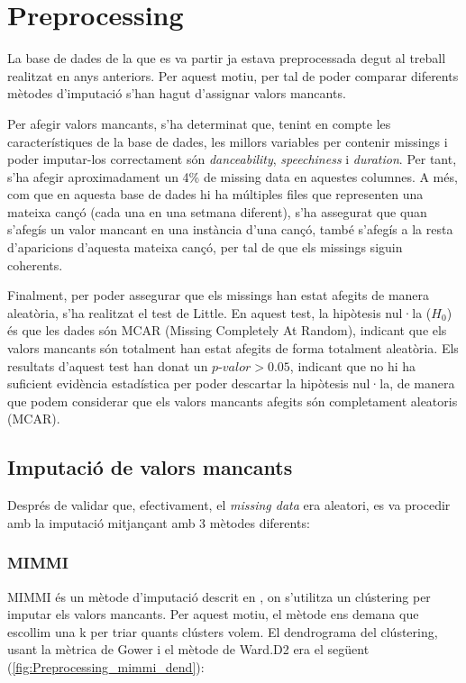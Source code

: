 \section{Preprocessing}
La base de dades de la que es va partir ja estava preprocessada degut al treball realitzat en anys anteriors. Per aquest motiu, per tal de poder comparar diferents mètodes d'imputació s'han hagut d'assignar valors mancants.

Per afegir valors mancants, s'ha determinat que, tenint en compte les característiques de la base de dades, les millors variables per contenir missings i poder imputar-los correctament són \textit{danceability}, \textit{speechiness} i \textit{duration}. Per tant, s'ha afegir aproximadament un 4\% de missing data en aquestes columnes. A més, com que en aquesta base de dades hi ha múltiples files que representen una mateixa cançó (cada una en una setmana diferent), s'ha assegurat que quan s'afegís un valor mancant en una instància d'una cançó, també s'afegís a la resta d'aparicions d'aquesta mateixa cançó, per tal de que els missings siguin coherents.

Finalment, per poder assegurar que els missings han estat afegits de manera aleatòria, s'ha realitzat el test de Little. En aquest test, la hipòtesis nul·la ($H_0$) és que les dades són MCAR (Missing Completely At Random), indicant que els valors mancants són totalment han estat afegits de forma totalment aleatòria. Els resultats d'aquest test han donat un $\textit{p-valor} > 0.05$, indicant que no hi ha suficient evidència estadística per poder descartar la hipòtesis nul·la, de manera que podem considerar que els valors mancants afegits són completament aleatoris (MCAR).

\subsection{Imputació de valors mancants}
Després de validar que, efectivament, el \textit{missing data} era aleatori, es va procedir amb la imputació mitjançant amb 3 mètodes diferents:

\subsubsection{MIMMI}

MIMMI és un mètode d'imputació descrit en \cite{gibert_2013_mixed}, on s'utilitza un clústering per imputar els valors mancants. Per aquest motiu, el mètode ens demana que escollim una k per triar quants clústers volem. El dendrograma del clústering, usant la mètrica de Gower i el mètode de Ward.D2 era el següent (\ref{fig:Preprocessing_mimmi_dend}):

